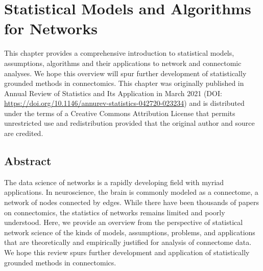 \chapter{Statistical Models and Algorithms for Networks} \label{chap:statistical}

This chapter provides a comprehensive introduction to statistical models, assumptions, algorithms and their applications to network and connectomic analyses. We hope this overview will spur further development of statistically grounded methods in connectomics. This chapter was originally published in Annual Review of Statistics and Its Application in March 2021 (DOI: \url{https://doi.org/10.1146/annurev-statistics-042720-023234}) and is distributed under the terms of a Creative Commons Attribution License that permits unrestricted use and redistribution provided that the original author and source are credited.

\begin{singlespace}         %
\end{singlespace} 

\pagebreak
\section*{Abstract}
The data science of networks is a rapidly developing field with myriad applications.  In neuroscience, the brain is commonly modeled as a connectome, a network of nodes connected by edges. While there have been thousands of papers on connectomics, the statistics of networks remains limited and poorly understood.  Here, we provide an overview from the perspective of statistical network science of the kinds of models, assumptions, problems, and applications that are theoretically and empirically justified for analysis of connectome data.  We hope this review spurs further development and application of statistically grounded methods in connectomics.
\pagebreak










